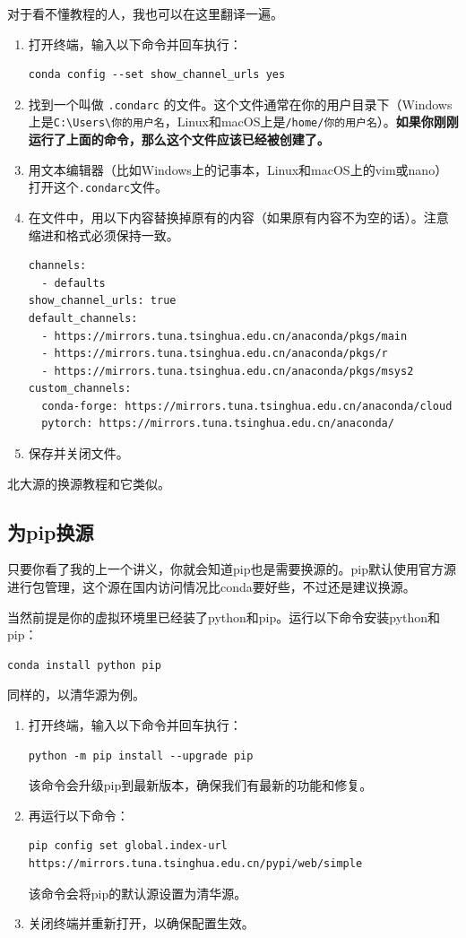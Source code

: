 \documentclass[12pt]{ctexart}
\begin{document}
对于看不懂教程的人，我也可以在这里翻译一遍。

\begin{enumerate}
    \item 打开终端，输入以下命令并回车执行：
    \begin{verbatim}
conda config --set show_channel_urls yes
    \end{verbatim}
    \item 找到一个叫做 \texttt{.condarc} 的文件。这个文件通常在你的用户目录下（Windows上是\texttt{C:\textbackslash Users\textbackslash 你的用户名}，Linux和macOS上是\texttt{/home/你的用户名}）。\textbf{如果你刚刚运行了上面的命令，那么这个文件应该已经被创建了。}
    \item 用文本编辑器（比如Windows上的记事本，Linux和macOS上的vim或nano）打开这个\texttt{.condarc}文件。
    \item 在文件中，用以下内容替换掉原有的内容（如果原有内容不为空的话）。注意缩进和格式必须保持一致。
    \begin{verbatim}
channels:
  - defaults
show_channel_urls: true
default_channels:
  - https://mirrors.tuna.tsinghua.edu.cn/anaconda/pkgs/main
  - https://mirrors.tuna.tsinghua.edu.cn/anaconda/pkgs/r
  - https://mirrors.tuna.tsinghua.edu.cn/anaconda/pkgs/msys2
custom_channels:
  conda-forge: https://mirrors.tuna.tsinghua.edu.cn/anaconda/cloud
  pytorch: https://mirrors.tuna.tsinghua.edu.cn/anaconda/
    \end{verbatim}
    \item 保存并关闭文件。
\end{enumerate}

北大源的换源教程和它类似。

\subsection{为pip换源}

只要你看了我的上一个讲义，你就会知道pip也是需要换源的。pip默认使用官方源进行包管理，这个源在国内访问情况比conda要好些，不过还是建议换源。

当然前提是你的虚拟环境里已经装了python和pip。运行以下命令安装python和pip：
\begin{verbatim}
conda install python pip
\end{verbatim}

同样的，以清华源为例。

\begin{enumerate}
    \item 打开终端，输入以下命令并回车执行：
    \begin{verbatim}
python -m pip install --upgrade pip
    \end{verbatim}
    该命令会升级pip到最新版本，确保我们有最新的功能和修复。
    \item 再运行以下命令：
    \begin{verbatim}
pip config set global.index-url https://mirrors.tuna.tsinghua.edu.cn/pypi/web/simple
    \end{verbatim}
    该命令会将pip的默认源设置为清华源。
    \item 关闭终端并重新打开，以确保配置生效。
\end{enumerate}
\end{document}
